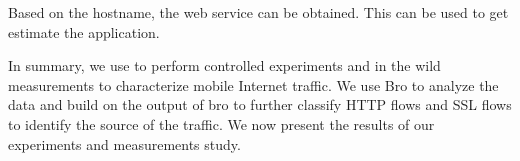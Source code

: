 
Based on the hostname, the web service can be obtained. 
This can be used to get estimate the application.

 
In summary, we use \platname to perform controlled experiments and in the wild measurements to characterize mobile Internet traffic. 
We use Bro to analyze the data and build on the output of bro to further classify HTTP flows and SSL flows to identify the source of the traffic. 
We now present the results of our experiments and measurements study. 



